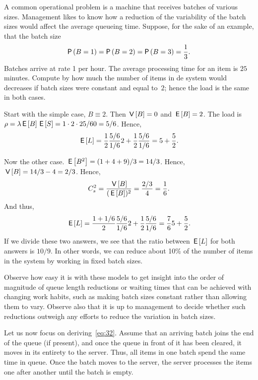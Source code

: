 \begin{exercise}
  A common operational problem is a machine that receives batches of
  various sizes. Management likes to know how a reduction of the
  variability of the batch sizes would affect the average queueing time.
  Suppose, for the sake of an example, that the batch size 
  \begin{equation*}
    \P{B=1} = \P{B=2} = \P{B=3} = \frac 13.
  \end{equation*}
  Batches arrive at rate 1 per hour.
  The average processing time for an item is $25$ minutes.
  Compute by how much the number of items in de system would decreases if batch sizes were constant and equal to~$2$; hence the load is the same in both cases.
\begin{solution}
    Start with the simple case, $B\equiv 2$. Then $\,\mathsf{V}\left[B\right]=0$ and
    $\,\mathsf{E}\left[B\right] = 2$. The load is $\rho=\lambda \,\mathsf{E}\left[B\right] \,\mathsf{E}\left[S\right] = 1\cdot 2 \cdot 25/60 = 5/6$.  Hence,
    \begin{equation*}
      \,\mathsf{E}\left[L\right] = \frac 12 \frac{5/6}{1/6} 2 + \frac 12 \frac{5/6}{1/6} = 5 + \frac52.
    \end{equation*}

Now the other case. $\,\mathsf{E}\left[B^2\right] = (1+4+9)/3 = 14/3$. Hence, $\,\mathsf{V}\left[B\right]=14/3 - 4=2/3$. Hence, 
\begin{equation*}
C_s^2=\frac{\,\mathsf{V}\left[B\right]}{(\,\mathsf{E}\left[B\right])^2} = \frac{2/3}4 = \frac 16.
\end{equation*}
And thus, 
    \begin{equation*}
      \,\mathsf{E}\left[L\right] = \frac {1+1/6}2 \frac{5/6}{1/6} 2 + \frac 12 \frac{5/6}{1/6} = \frac76 5 + \frac 52.
    \end{equation*}
    If we divide these two answers, we see that the ratio between
    $\,\mathsf{E}\left[L\right]$ for both answers is $10/9$. In other words, we can
    reduce about 10\% of the number of items in the system by working
    in fixed batch sizes. 

Observe how easy it is with these models to get insight into the order of magnitude of queue length reductions or waiting times that can be achieved with changing work habits, such as making batch sizes constant rather than allowing them to vary.
Observe also that it is up to management to decide whether such reductions outweigh any efforts to reduce the variation in batch sizes.

\end{solution}

\end{exercise}


Let us now focus on deriving~\cref{eq:32}.
Assume that an arriving batch joins the end of the queue (if present), and once the queue in front of it has been cleared, it moves in its entirety to the server.
Thus, all items in one batch spend the same time in queue.
Once the batch moves to the server, the server processes the items one after another until the batch is empty.

